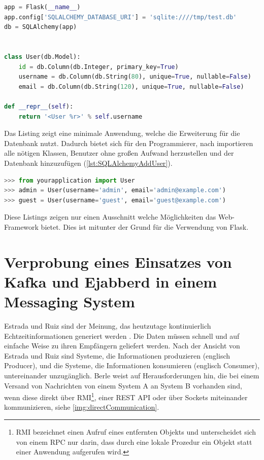 \documentclass[a4paper,titlepage,halfparskip,12pt]{scrreprt}
\begin{document}
\begin{onehalfspacing}
\begin{lstlisting}[language=Python,caption=Example Listing of Flask-SQLAlchemy,label={lst:SQLAlchemyMinApp}]
app = Flask(__name__)
app.config['SQLALCHEMY_DATABASE_URI'] = 'sqlite:////tmp/test.db'
db = SQLAlchemy(app)


class User(db.Model):
	id = db.Column(db.Integer, primary_key=True)
	username = db.Column(db.String(80), unique=True, nullable=False)
	email = db.Column(db.String(120), unique=True, nullable=False)

def __repr__(self):
	return '<User %r>' % self.username
\end{lstlisting}
Das Listing zeigt eine minimale Anwendung, welche die Erweiterung für die Datenbank nutzt. Dadurch bietet sich für den Programmierer, nach importieren alle nötigen Klassen, Benutzer ohne großen Aufwand herzustellen und der Datenbank hinzuzufügen (\autoref{lst:SQLAlchemyAddUser}).
\begin{lstlisting}[language=Python,caption=Hinzufügen eines Objektes in die Datenbanktabelle,label={lst:SQLAlchemyAddUser}]
>>> from yourapplication import User
>>> admin = User(username='admin', email='admin@example.com')
>>> guest = User(username='guest', email='guest@example.com')
\end{lstlisting}
Diese Listings zeigen nur einen Ausschnitt welche Möglichkeiten das Web-Framework bietet. Dies ist mitunter der Grund für die Verwendung von Flask.\cite{FlaskDoc}
\pagebreak

\section{Verprobung eines Einsatzes von Kafka und Ejabberd in einem Messaging System}
\label{sec:VerprbungIMS}

Estrada und Ruiz sind der Meinung, das heutzutage kontinuierlich Echtzeitinformationen generiert werden \cite{estradaRuiz2016}. Die Daten müssen schnell und auf einfache Weise zu ihren Empfängern geliefert werden. Nach der Ansicht von Estrada und Ruiz \cite{estradaRuiz2016} sind Systeme, die Informationen produzieren (englisch Producer), und die Systeme, die Informationen konsumieren (englisch Consumer), untereinander unzugänglich. Berle \cite{berleKafkaOverview} weist auf Herausforderungen hin, die bei einem Versand von Nachrichten von einem System A an System B vorhanden sind, wenn diese direkt über \acs{RMI}\footnote{\ac{RMI} bezeichnet einen Aufruf eines entfernten Objekts und unterscheidet sich von einem \ac{RPC} nur darin, dass durch eine lokale Prozedur ein Objekt statt einer Anwendung aufgerufen wird.\cite[S.41]{andrew2008verteilte}}, einer \acs{REST} \acs{API} oder über Sockets miteinander kommunizieren, siehe \autoref{img:directCommunication}.


\end{onehalfspacing}
\end{document}
